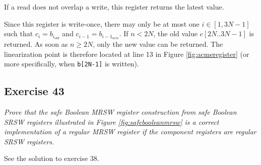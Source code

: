 \documentclass[a4paper,10pt]{article}
\begin{document}
If a read does not overlap a write, this register returns the latest value.

Since this register is write-once, there may only be at most one $i \in [1, 3N-1]$
such that $c_i = b_{i_{old}}$ and $c_{i - 1} = b_{{i - 1}_{new}}$. If $n < 2N$,
the old value $c[2N..3N-1]$ is returned. As soon as $n \geq 2N$, only the new value
can be returned. The linearization point is therefore located at line 13 in Figure
\ref{fig:acmeregister} (or more specifically, when \lstinline|b[2N-1]| is written).

\vspace{3mm}

\subsection{Exercise 43}

\emph{Prove that the safe Boolean MRSW register construction from safe
Boolean SRSW registers illustrated in Figure \ref{fig:safebooleanmrsw} is a correct implementation of a
regular MRSW register if the component registers are regular SRSW registers.}

\vspace{3mm}

See the solution to exercise 38.

\vspace{3mm}
\end{document}
